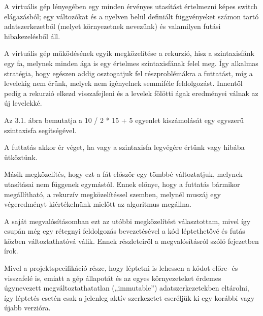 A virtuális gép lényegében egy minden érvényes utasítást értelmezni képes switch elágazásból; egy változókat és a nyelven belül definiált függvényeket számon tartó adatszerkezetből (melyet környezetnek nevezünk) és valamilyen futási hibakezelésből áll.

A virtuális gép működésének egyik megközelítése a rekurzió, hisz a szintaxisfánk egy fa, melynek minden ága is egy értelmes szintaxisfának felel meg. Így alkalmas stratégia, hogy egészen addig osztogatjuk fel részproblémákra a futtatást, míg a levelekig nem érünk, melyek nem igényelnek semmiféle feldolgozást. Innentől pedig a rekurzió elkezd visszafejleni és a levelek fölötti ágak eredményei válnak az új levelekké.

Az 3.1. ábra bemutatja a 10 / 2 * 15 + 5 egyenlet kiszámolását egy egyszerű szintaxisfa segítségével.



A futtatás akkor ér véget, ha vagy a szintaxisfa legvégére értünk vagy hibába ütköztünk. 

Másik megközelítés, hogy ezt a fát először egy tömbbé változtatjuk, melynek utasításai nem függenek egymástól. Ennek előnye, hogy a futtatás bármikor megállítható, a rekurzív megközelítéssel szemben, melynél muszáj egy végeredményt kiértékelnünk mielőtt az algoritmus megállna. 

A saját megvalósításomban ezt az utóbbi megközelítést választottam, mivel így csupán még egy rétegnyi feldolgozás bevezetésével a kód léptethetővé és futás közben változtathatóvá válik. Ennek részleteiről a megvalósításról szóló fejezetben írok.

Mivel a projektspecifikáció része, hogy léptetni is lehessen a kódot előre- és visszafelé is, emiatt a gép állapotát és az egyes környezeteket érdemes úgynevezett megváltoztathatatlan („immutable”) adatszerkezetekben eltárolni, így léptetés esetén csak a jelenleg aktív szerkezetet cseréljük ki egy korábbi vagy újabb verzióra.